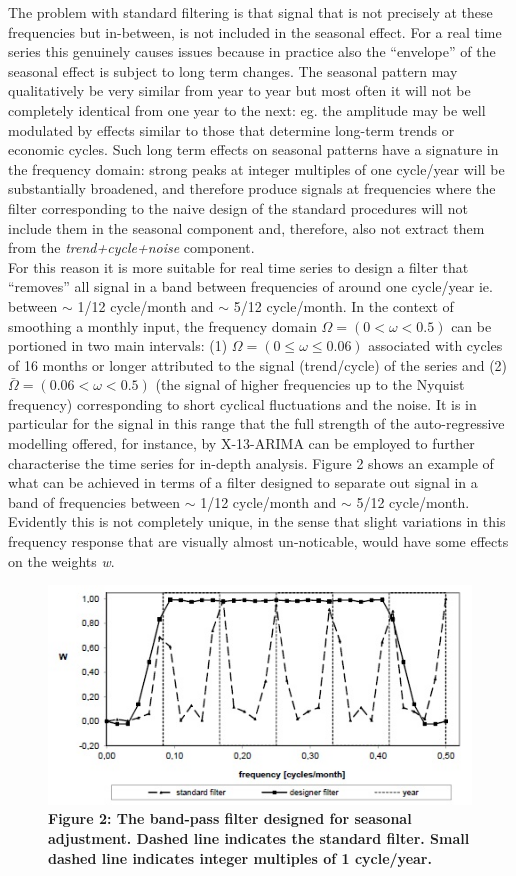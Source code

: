 \documentclass{article}
\begin{document}
The problem with standard filtering is that signal that is not precisely at these frequencies but in-between, is not included in the seasonal effect. For a real time series this genuinely causes issues because in practice also the ``envelope'' of the seasonal effect is subject to long term changes. The seasonal pattern may qualitatively be very similar from year to year but most often it will not be completely identical from one year to the next: eg. the amplitude may be well modulated by effects similar to those that determine long-term trends or economic cycles. Such long term effects on seasonal patterns have a signature in the frequency domain: strong peaks at integer multiples of one cycle/year will be substantially broadened, and therefore produce signals at frequencies where the filter corresponding to the naive design of the standard procedures will not include them in the seasonal component and, therefore, also not extract them from the \textit{trend+cycle+noise} component.\\For this reason it is more suitable for real time series to design a filter that ``removes'' all signal in a band between frequencies of around one cycle/year ie. between $\sim$ 1/12 cycle/month and $\sim$ 5/12 cycle/month. In the context of smoothing a monthly input, the frequency domain $\Omega=(0<\omega<0.5)$ can be portioned in two main intervals: (1) $\Omega=(0 \leq \omega \leq 0.06)$ associated with cycles of 16 months or longer attributed to the signal (trend/cycle) of the series and (2) $\bar{\Omega}=(0.06 < \omega < 0.5)$ (the signal of higher frequencies up to the Nyquist frequency) corresponding to short cyclical fluctuations and the noise. It is in particular for the signal in this range that the full strength of the auto-regressive modelling offered, for instance, by X-13-ARIMA can be employed to further characterise the time series for in-depth analysis. Figure 2 shows an example of what can be achieved in terms of a filter designed to separate out signal in a band of frequencies between $\sim$ 1/12 cycle/month and $\sim$ 5/12 cycle/month. Evidently this is not completely unique, in the sense that slight variations in this frequency response that are visually almost un-noticable, would have some effects on the weights \textit{w}.
\begin{figure}[H]
  \includegraphics[width=\linewidth]{../images/capitolo2/filters.jpg}
 {\textbf{\scriptsize Figure 2: The band-pass filter designed for seasonal adjustment. Dashed line indicates the standard filter. Small dashed line indicates integer multiples of 1 cycle/year.}}
\end{figure}
\end{document}
